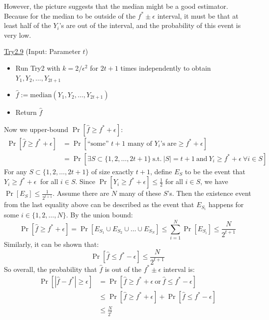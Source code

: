 \documentclass[11pt]{article}
\newcommand{\hf}{\hat{f}}
\begin{document}
 However, the picture suggests that the median might be a good estimator. Because for the median to be outside of the $f^*\pm \epsilon$ interval, it must be that at least half of the $Y_i$'s are out of the interval, and the probability of this event is very low.
 \begin{mdframed}[backgroundcolor=blue!05,topline=false,bottomline=false,leftline=false,rightline=false] 
	\underline{\sc Try2.9}
	(Input: Parameter $t$)
	\begin{itemize}
		\item Run Try2 with $k = 2/\epsilon^2$ for $2t+1$ times independently to obtain $Y_1,Y_2,\dots,Y_{2t+1}$
		\item $ \hf := \text{median}(Y_1,Y_2,\dots,Y_{2t+1})$
		\item Return $\hf$
	\end{itemize}
\end{mdframed}
Now we upper-bound $\Pr[\hf \geq f^* + \epsilon]$:
\begin{align*}
    \Pr[\hf \geq f^* + \epsilon] &= \Pr[\text{``some'' $t+1$ many of $Y_i$'s are} \geq f^* + \epsilon]\\
    &= \Pr[\exists S \subset \{1,2,\dots,2t+1\} \ \text{s.t.} \ |S| = t+1 \ \text{and}\ Y_i \geq f^* + \epsilon \ \forall i \in S]
\end{align*}
For any $S \subset \{1,2,\dots,2t+1\}$ of size exactly $t+1$, define $E_S$ to be the event that $Y_i \geq f^* + \epsilon \ $ for all $i \in S$. Since $\Pr[Y_i \geq f^* + \epsilon] \leq \frac{1}{2}$ for all $i \in S$, we have $\Pr[E_S] \leq \frac{1}{2^{t+1}}$.
Assume there are $N$ many of these $S$'s. Then the existence event from the last equality above can be described as the event that $E_{S_i}$ happens for some $i \in \{1,2,\dots,N\}$. By the union bound:
\begin{equation*}
    \Pr[\hf \geq f^* + \epsilon] =  \Pr[E_{S_1}\cup E_{S_2}\cup \dots \cup E_{S_N}]
    \leq \sum\limits_{i=1}^N \Pr[E_{S_i}] \leq \frac{N}{2^{t+1}}
\end{equation*}
Similarly, it can be shown that:
\begin{equation*}
    \Pr[\hf \leq f^* - \epsilon] \leq \frac{N}{2^{t+1}}
\end{equation*}
So overall, the probability that $\hf$ is out of the $f^*\pm \epsilon$ interval is:
\begin{align*}
    \Pr[|\hf - f^*| \geq \epsilon] &= \Pr[\hf \geq f^* + \epsilon \ \text{or} \ \hf \leq f^* - \epsilon]\\
    &\leq \Pr[\hf \geq f^* + \epsilon] + \Pr[\hf \leq f^* - \epsilon]\\
    &\leq \frac{N}{2^t}
\end{align*}
\end{document}
